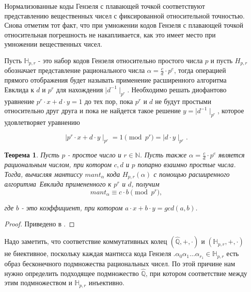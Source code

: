 \documentclass[master, och, diploma, times]{sty/SCWorks}
\theoremstyle{plain}
\newtheorem{thethm}{Теорема}[section]
\theoremstyle{definition}
\numberwithin{equation}{section}
\begin{document}
Нормализованные коды Гензеля с плавающей точкой соответствуют представлению вещественных чисел с фиксированной относительной точностью. Снова отметим тот факт, что при умножении кодов Гензеля с плавающей точкой относительная погрешность не накапливается, как это имеет место при умножении вещественных чисел.

Пусть $\mathbb{H}_{p,r}$ - это набор кодов Гензеля относительно простого числа $p$ и пусть $H_{p,r}$ обозначает представление рационального числа $\alpha=\frac{c}{d}\cdot p^e$, тогда операцией прямого отображения будет называть применение расширенного алгоритма Евклида к $d$ и $p^r$ для нахождения $\mid d^{-1} \mid_{p^r}$. Необходимо решать диофантово уравнение $p^r \cdot x + d \cdot y = 1$ до тех пор, пока $p^r$ и $d$ не будут простыми относительно друг друга и пока не найдется такое решение $y=\mid d^{-1} \mid_{p^r}$, которое удовлетворяет уравнению

\begin{equation}
\mid p^r \cdot x + d \cdot y \mid_{p^r} = 1 \pmod{p^r} = \mid d \cdot y \mid_{p^r}.
\end{equation}


\begin{thethm}\label{th:forward_mapping}
Пусть $p$ - простое число и $r \in \mathbb{N}$. Пусть также $\alpha=\frac{c}{d} \cdot p^e$ является рациональным числом, при котором $c, d$ и $p$ попарно взаимно простые числа. Тогда, вычисляя мантиссу $mant_{\alpha}$ кода $H_{p,r}(\alpha)$ с помощью \mbox{расширенного} \mbox{алгоритма Евклида} примененного к $p^r$ и $d$, получим
\begin{equation}
mant_{\alpha} \equiv c \cdot b \pmod {p^r},
\end{equation}

\noindent где $b$ - это коэффициент, при котором $a\cdot x+b\cdot y = gcd(a,b)$.
\end{thethm}

\begin{proof} 
Приведено в \cite{bib:numbers:miola}.
\end{proof}


Надо заметить, что соответствие коммутативных колец $(\hat{\mathbb{Q}},+,\cdot)$ и $(\mathbb{H}_{p,r},+,\cdot)$ не биективное, поскольку каждая мантисса кода Гензеля $.\alpha_0\alpha_1\dots\alpha_{r_1} \in \mathbb{H}_{p,r}$ есть образ бесконечного подмножества рациональных чисел. По этой причине нам нужно определить подходящее подмножество $\hat{\mathbb{Q}}$, при котором соответствие между этим подмножеством и $\mathbb{H}_{p,r}$ \mbox{инъективно}.
\end{document}
